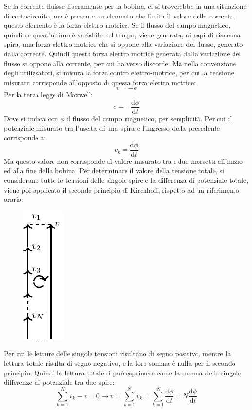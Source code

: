 \documentclass{article}
\newcommand{\df}{\mathrm{d}}
\numberwithin{equation}{subsection}
\begin{document}
Se la corrente fluisse liberamente per la bobina, ci si troverebbe in una situazione di cortocircuito, ma è presente un elemento che limita il valore della corrente, questo 
elemento è la forza elettro motrice. 
Se il flusso del campo magnetico, quindi se quest'ultimo è variabile nel tempo, viene generata, ai capi di ciascuna spira, una forza elettro motrice che si oppone alla variazione 
del flusso, generato dalla corrente. Quindi questa forza elettro motrice generata dalla variazione del flusso si oppone alla corrente, per cui ha verso discorde. Ma nella 
convenzione degli utilizzatori, si misura la forza contro elettro-motrice, per cui la tensione misurata corrisponde all'opposto di questa forza elettro motrice: 
\begin{equation*}
    v=-e
\end{equation*}
Per la terza legge di Maxwell:
\begin{equation*}
    e=-\displaystyle\frac{\df\phi}{\df t}
\end{equation*}
Dove si indica con $\phi$ il flusso del campo magnetico, per semplicità. Per cui il potenziale misurato tra l'uscita di una spira e l'ingresso della precedente corrisponde a:
\begin{equation*}
    v_k=\displaystyle\frac{\df\phi}{\df t}
\end{equation*}
Ma questo valore non corrisponde al valore misurato tra i due morsetti all'inizio ed alla fine della bobina. Per determinare il valore della tensione totale, si considerano 
tutte le tensioni delle singole spire e la differenza di potenziale totale, viene poi applicato il secondo principio di Kirchhoff, rispetto ad un riferimento orario:
\begin{figure}[H]%
    \centering
    \includegraphics{bobina-principio-tensioni.pdf}
    \label{fig:bobina-principio-tensioni}
\end{figure}
Per cui le letture delle singole tensioni risultano di segno positivo, mentre la lettura totale risulta di segno negativo, e la loro somma è nulla per il secondo principio. 
Quindi la lettura totale si può esprimere come la somma delle singole differenze di potenziale tra due spire:
\begin{equation*}
    \displaystyle\sum_{k=1}^Nv_k-v=0\to v=\sum_{k=1}^Nv_k=\sum_{k=1}^N\frac{\df\phi}{\df t}=N\frac{\df\phi}{\df t}
\end{equation*}
\end{document}

